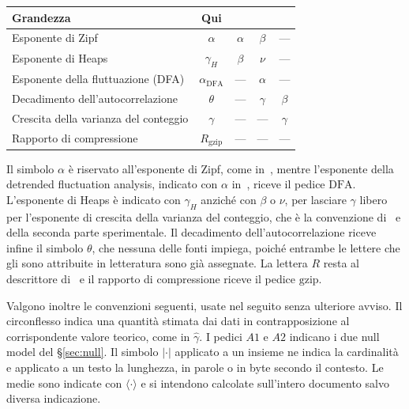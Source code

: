 \begin{center}
\small
\begin{tabular}{@{}lcccc@{}}
\toprule
Grandezza & Qui & \cite{mikhaylovskiy2025zipf} & \cite{lippi2019} & \cite{altmann2012} \\
\midrule
Esponente di Zipf                  & $\alpha$                & $\alpha$ & $\beta$  & --- \\
Esponente di Heaps                 & $\gamma_H$              & $\beta$  & $\nu$    & --- \\
Esponente della fluttuazione (DFA) & $\alpha_{\mathrm{DFA}}$ & ---      & $\alpha$ & --- \\
Decadimento dell'autocorrelazione  & $\theta$                & ---      & $\gamma$ & $\beta$ \\
Crescita della varianza del conteggio & $\gamma$             & ---      & ---      & $\gamma$ \\
Rapporto di compressione           & $R_{\mathrm{gzip}}$     & ---      & ---      & --- \\
\bottomrule
\end{tabular}
\label{tab:collisioni}
\end{center}

Il simbolo $\alpha$ è riservato all'esponente di Zipf, come
in~\cite{mikhaylovskiy2025zipf}, mentre l'esponente della detrended
fluctuation analysis, indicato con $\alpha$ in~\cite{lippi2019}, riceve il
pedice $\mathrm{DFA}$. L'esponente di Heaps è indicato con $\gamma_H$ anziché
con $\beta$ o $\nu$, per lasciare $\gamma$ libero per l'esponente di crescita
della varianza del conteggio, che è la convenzione di~\cite{altmann2012} e
della seconda parte sperimentale. Il decadimento dell'autocorrelazione riceve
infine il simbolo $\theta$, che nessuna delle fonti impiega, poiché entrambe
le lettere che gli sono attribuite in letteratura sono già assegnate. La
lettera $R$ resta al descrittore di~\cite{mikhaylovskiy2025zipf} e il rapporto
di compressione riceve il pedice $\mathrm{gzip}$.

Valgono inoltre le convenzioni seguenti, usate nel seguito senza ulteriore
avviso. Il circonflesso indica una quantità stimata dai dati in contrapposizione
al corrispondente valore teorico, come in $\hat\gamma$. I pedici $A1$ e $A2$
indicano i due null model del §\ref{sec:null}. Il simbolo $|\cdot|$ applicato a
un insieme ne indica la cardinalità e applicato a un testo la lunghezza, in
parole o in byte secondo il contesto. Le medie sono indicate con
$\langle\cdot\rangle$ e si intendono calcolate sull'intero documento salvo
diversa indicazione.
